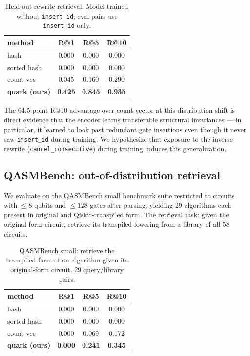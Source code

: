 \documentclass[11pt]{article}
\begin{document}
\begin{table}[h]
\centering
\begin{tabular}{lccc}
\toprule
method & R@1 & R@5 & R@10 \\
\midrule
hash & 0.000 & 0.000 & 0.000 \\
sorted hash & 0.000 & 0.000 & 0.000 \\
count vec & 0.045 & 0.160 & 0.290 \\
\textbf{quark (ours)} & \textbf{0.425} & \textbf{0.845} & \textbf{0.935} \\
\bottomrule
\end{tabular}
\caption{Held-out-rewrite retrieval. Model trained without \texttt{insert\_id}; eval pairs use \texttt{insert\_id} only.}
\end{table}

The 64.5-point R@10 advantage over count-vector at this distribution shift is direct evidence that the encoder learns transferable structural invariances --- in particular, it learned to look past redundant gate insertions even though it never saw \texttt{insert\_id} during training. We hypothesize that exposure to the inverse rewrite (\texttt{cancel\_consecutive}) during training induces this generalization.

\subsection{QASMBench: out-of-distribution retrieval}

We evaluate on the QASMBench small benchmark suite \cite{qasmbench} restricted to circuits with $\leq 8$ qubits and $\leq 128$ gates after parsing, yielding 29 algorithms each present in original and Qiskit-transpiled form. The retrieval task: given the original-form circuit, retrieve its transpiled lowering from a library of all 58 circuits.

\begin{table}[h]
\centering
\begin{tabular}{lccc}
\toprule
method & R@1 & R@5 & R@10 \\
\midrule
hash & 0.000 & 0.000 & 0.000 \\
sorted hash & 0.000 & 0.000 & 0.000 \\
count vec & 0.000 & 0.069 & 0.172 \\
\textbf{quark (ours)} & \textbf{0.000} & \textbf{0.241} & \textbf{0.345} \\
\bottomrule
\end{tabular}
\caption{QASMBench small: retrieve the transpiled form of an algorithm given its original-form circuit. 29 query/library pairs.}
\end{table}
\end{document}
